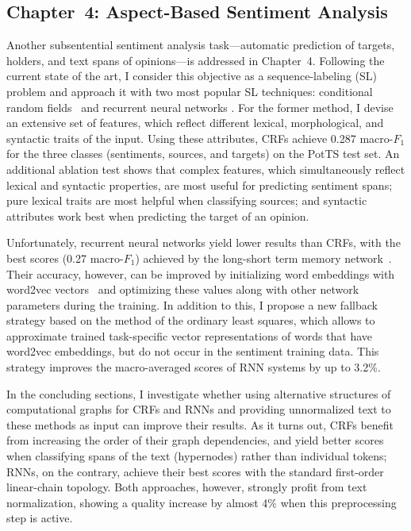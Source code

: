 \documentclass[11pt]{article}
\newcommand{\F}[0]{$F_1$}
\renewcommand{\cite}{\citep}
\begin{document}
\subsection{Chapter~4: Aspect-Based Sentiment Analysis}

Another subsentential sentiment analysis task---automatic prediction
of targets, holders, and text spans of opinions---is addressed in
Chapter~4.  Following the current state of the art, I consider this
objective as a sequence-labeling (SL) problem and approach it with two
most popular SL techniques: conditional random fields~\cite[CRFs;
][]{Lafferty:01} and recurrent neural networks \cite[RNNs;
][]{Hochreiter:97}.  For the former method, I devise an extensive set
of features, which reflect different lexical, morphological, and
syntactic traits of the input.  Using these attributes, CRFs achieve
0.287 macro-\F{} for the three classes (sentiments, sources, and
targets) on the PotTS test set.  An additional ablation test shows
that complex features, which simultaneously reflect lexical and
syntactic properties, are most useful for predicting sentiment spans;
pure lexical traits are most helpful when classifying sources; and
syntactic attributes work best when predicting the target of an
opinion.

Unfortunately, recurrent neural networks yield lower results than
CRFs, with the best scores (0.27 macro-\F{}) achieved by the
long-short term memory network~\cite[LSTM; ][]{Hochreiter:97}.  Their
accuracy, however, can be improved by initializing word embeddings
with word2vec vectors~\cite{Mikolov:13} and optimizing these values
along with other network parameters during the training.  In addition
to this, I propose a new fallback strategy based on the method of the
ordinary least squares, which allows to approximate trained
task-specific vector representations of words that have word2vec
embeddings, but do not occur in the sentiment training data.  This
strategy improves the macro-averaged scores of RNN systems by up to
3.2\%.

In the concluding sections, I investigate whether using alternative
structures of computational graphs for CRFs and RNNs and providing
unnormalized text to these methods as input can improve their results.
As it turns out, CRFs benefit from increasing the order of their graph
dependencies, and yield better scores when classifying spans of the
text (hypernodes) rather than individual tokens; RNNs, on the
contrary, achieve their best scores with the standard first-order
linear-chain topology.  Both approaches, however, strongly profit from
text normalization, showing a quality increase by almost 4\% when this
preprocessing step is active.
\end{document}
